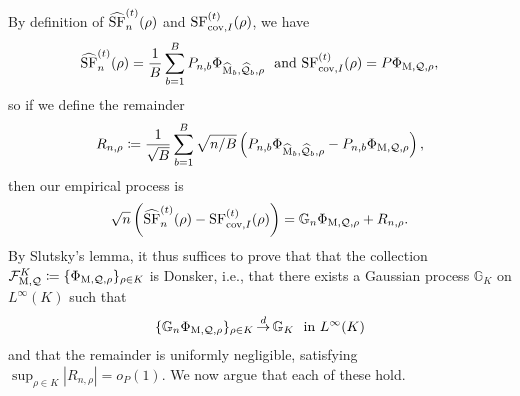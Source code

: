 By definition of $\widehat{\operatorname*{SF}}^{(t)}_n(\rho)$ and $
{\operatorname*{SF}}_{\textup{cov}, I}^{(t)}(\rho)$, we have
\begin{align*}
  \widehat{\operatorname*{SF}}^{(t)}_n(\rho) = \frac{1}{B} \sum_{b=1}^B P_{n,b} \Phi_{\widehat{\operatorname*{M}}_b, \widehat{\mathcal{Q}}_b, \rho} ~ \text{ and } {\operatorname*{SF}}_{\textup{cov}, I}^{(t)}(\rho) = P \Phi_{\operatorname*{M}, \mathcal{Q}, \rho},
\end{align*}
so if we define the remainder 
\begin{align*}
  R_{n, \rho} \coloneqq \frac{1}{\sqrt{B}}\sum_{b=1}^B \sqrt{n/B} \left( P_{n,b} \Phi_{\widehat{\operatorname*{M}}_b, \widehat{\mathcal{Q}}_b, \rho} - P_{n,b} \Phi_{\operatorname*{M},  \mathcal{Q}, \rho} \right),
\end{align*}
then our empirical process is
\begin{align*}
  \sqrt{n} \left( \widehat{\operatorname*{SF}}^{(t)}_n(\rho) - {\operatorname*{SF}}_{\textup{cov}, I}^{(t)}(\rho) \right)
  = \mathbb{G}_n \Phi_{\operatorname*{M}, \mathcal{Q}, \rho} + R_{n, \rho}.
\end{align*}
By Slutsky's lemma, it thus suffices to prove that that the collection
$\mathcal{F}_{\operatorname*{M}, \mathcal{Q}}^K \coloneqq \{ \Phi_{\operatorname*{M}, \mathcal{Q}, \rho} \}_{\rho \in K}$
is Donsker, i.e., that there exists a Gaussian process $\mathbb{G}_K$ on
$L^\infty(K)$ such that
\begin{align*}
  \{\mathbb{G}_n \Phi_{\operatorname*{M}, \mathcal{Q}, \rho} \}_{\rho \in K}
  \mathop{\stackrel{d}{\rightarrow}} \mathbb{G}_K
  ~~ \mbox{in~} L^\infty(K)
\end{align*}
and that the remainder is uniformly negligible, satisfying $\sup_{\rho \in
  K} |R_{n,\rho}| = o_P(1)$.
We now argue that each of these hold.


